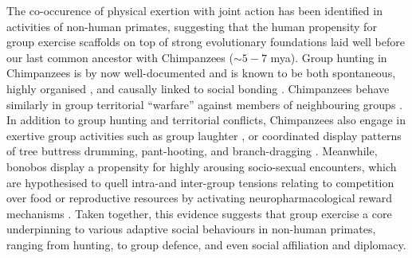 \begin{CJK}{UTF8}{gbsn}
The co-occurence of physical exertion with joint action has been identified in activities of non-human primates, suggesting that the human propensity for group exercise scaffolds on top of strong evolutionary foundations laid well before our last common ancestor with Chimpanzees ($\sim 5-7$ mya).  Group hunting in Chimpanzees is by now well-documented and is known to be both spontaneous, highly organised \citep[for example involving divisions of set roles][]{Boesch1989}, and causally linked to social bonding \citep{Mitani2001}.  Chimpanzees behave similarly in group territorial ``warfare'' against members of neighbouring groups \citep{Boehm1992,Wilson2014a}.
In addition to group hunting and territorial conflicts, Chimpanzees also engage in exertive group activities such as group laughter \citep{Waller2005}, or coordinated display patterns of tree buttress drumming, pant-hooting, and branch-dragging \citep[for example, observed as part of a ``rain dance,'' see][]{Goodall1971,Whiten2001}.  Meanwhile, bonobos display a propensity for highly arousing socio-sexual encounters, which are hypothesised to quell intra-and inter-group tensions relating to competition over food or reproductive resources by activating neuropharmacological reward mechanisms \citep{Dunbar1992,Parr2005,Clay2015}.  Taken together, this evidence suggests that group exercise a core underpinning to various adaptive social behaviours in non-human primates, ranging from hunting, to group defence, and even social affiliation and diplomacy.


\end{CJK}
